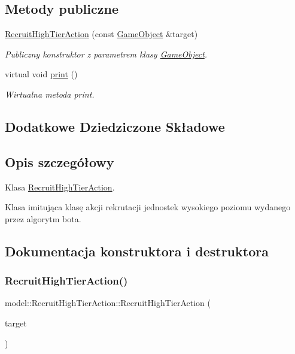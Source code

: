 \subsection*{Metody publiczne}
\begin{DoxyCompactItemize}
\item 
\hyperlink{classmodel_1_1RecruitHighTierAction_a470cfd0a143738a847ebf0a25e6ccd2c}{Recruit\+High\+Tier\+Action} (const \hyperlink{classmodel_1_1GameObject}{Game\+Object} \&target)
\begin{DoxyCompactList}\small\item\em Publiczny konstruktor z parametrem klasy \hyperlink{classmodel_1_1GameObject}{Game\+Object}. \end{DoxyCompactList}\item 
virtual void \hyperlink{classmodel_1_1RecruitHighTierAction_a0bedf8fdec991eff26a3eb9ffa5e552f}{print} ()
\begin{DoxyCompactList}\small\item\em Wirtualna metoda print. \end{DoxyCompactList}\end{DoxyCompactItemize}
\subsection*{Dodatkowe Dziedziczone Składowe}


\subsection{Opis szczegółowy}
Klasa \hyperlink{classmodel_1_1RecruitHighTierAction}{Recruit\+High\+Tier\+Action}. 

Klasa imitująca klasę akcji rekrutacji jednostek wysokiego poziomu wydanego przez algorytm bota. 

\subsection{Dokumentacja konstruktora i destruktora}
\mbox{\label{classmodel_1_1RecruitHighTierAction_a470cfd0a143738a847ebf0a25e6ccd2c}} 
\subsubsection{\texorpdfstring{Recruit\+High\+Tier\+Action()}{RecruitHighTierAction()}}
{\footnotesize\ttfamily model\+::\+Recruit\+High\+Tier\+Action\+::\+Recruit\+High\+Tier\+Action (\begin{DoxyParamCaption}\item[{const \hyperlink{classmodel_1_1GameObject}{Game\+Object} \&}]{target }\end{DoxyParamCaption})\hspace{0.3cm}{\ttfamily [inline]}}



